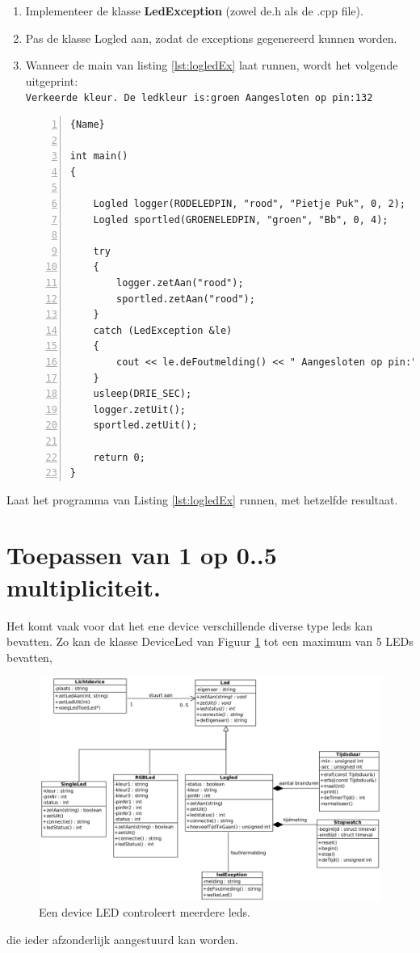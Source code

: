 \begin{enumerate}
	\item Implementeer de klasse \textbf{LedException} (zowel de.h als de .cpp file).
	\item Pas de klasse Logled aan, zodat de exceptions gegenereerd kunnen worden.
	\item Wanneer de main van listing \ref{lst:logledEx} laat runnen,
wordt het volgende uitgeprint:\\
\texttt{Verkeerde kleur. De ledkleur is:groen Aangesloten op pin:132}
\begin{lstlisting}[caption=Twee objecten van de klasse \texttt{LogLed}. ,frame=trbl,firstnumber=1,numbers=left,label={lst:logledEx}]{Name}
	
int main()
{
	
	Logled logger(RODELEDPIN, "rood", "Pietje Puk", 0, 2);
	Logled sportled(GROENELEDPIN, "groen", "Bb", 0, 4);
	
	try
	{
		logger.zetAan("rood");
		sportled.zetAan("rood");
	}
	catch (LedException &le)
	{
		cout << le.deFoutmelding() << " Aangesloten op pin:" << le.welkeLed()->connectie() << endl;
	}
	usleep(DRIE_SEC);
	logger.zetUit();
	sportled.zetUit();
	
	return 0;
}
\end{lstlisting}		
\end{enumerate}
Laat het programma van Listing \ref{lst:logledEx} runnen, met hetzelfde resultaat.

\section{Toepassen van 1 op  0..5 multipliciteit.}
Het komt vaak voor dat het ene device verschillende diverse type leds kan bevatten. Zo kan de klasse DeviceLed van Figuur \ref{fig:devled} tot een maximum van 5 LEDs bevatten,   
\begin{figure}[h!]
	\captionsetup{justification=centering}
	\includegraphics[width=1 \linewidth]{figuren/deviceled}     
	\centering
	\caption{Een device LED controleert meerdere leds.}
	\label{fig:devled}
\end{figure} 
die ieder afzonderlijk aangestuurd kan worden. 

